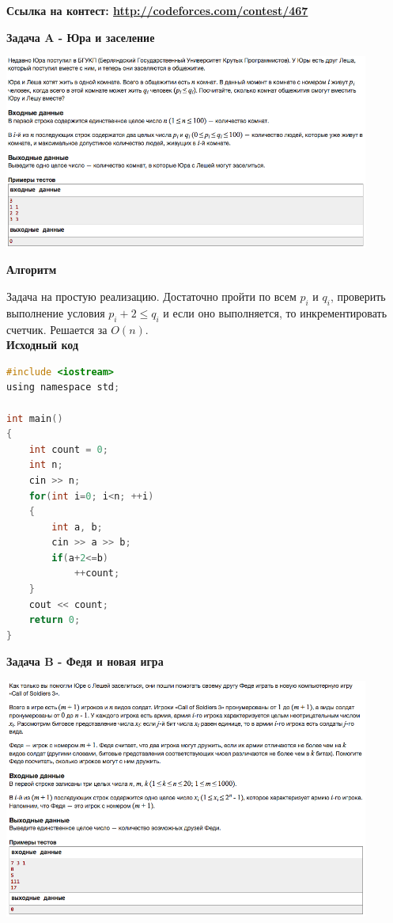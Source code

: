 \documentclass[a4paper,12pt]{article}
\begin{document}
\textbf{{\large Ссылка на контест: \url{http://codeforces.com/contest/467}}}

\newpage
\textbf{{\large Задача A - Юра и заселение}} \\
\begin{center}
\includegraphics[width=0.9\textwidth]{C_267/C_267_A.png}\\ [1cm]
\end{center}

\textbf{{\large Алгоритм}}

Задача на простую реализацию. Достаточно пройти по всем $p_i$ и $q_i$, проверить выполнение условия $p_i + 2 \leq q_i$ и если оно выполняется, то инкрементировать счетчик. Решается за $O(n)$. \\

\textbf{{\large Исходный код}} \\
\begin{lstlisting}[language=C]
#include <iostream>
using namespace std;

int main()
{
    int count = 0;
    int n;
    cin >> n;
    for(int i=0; i<n; ++i)
    {
        int a, b;
        cin >> a >> b;
        if(a+2<=b)
            ++count;
    }
    cout << count;
    return 0;
}
\end{lstlisting}

\newpage
\textbf{{\large Задача B - Федя и новая игра}} \\
\begin{center}
\includegraphics[width=0.9\textwidth]{C_267/C_267_B.png}\\ [1cm]
\end{center}
\end{document}
